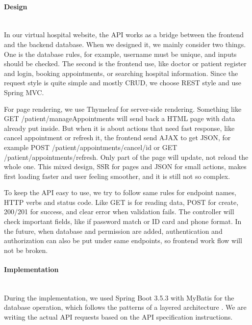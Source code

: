 %
%

\paragraph{Design}\mbox{}\\

In our virtual hospital website, the API works as a bridge between the frontend and the backend database. When we designed it, we mainly consider two things. One is the database rules, for example, username must be unique, and inputs should be checked. The second is the frontend use, like doctor or patient register and login, booking appointments, or searching hospital information. Since the request style is quite simple and mostly CRUD, we choose REST style and use Spring MVC.

For page rendering, we use Thymeleaf for server-side rendering. Something like GET /patient/manageAppointments will send back a HTML page with data already put inside. But when it is about actions that need fast response, like cancel appointment or refresh it, the frontend send AJAX to get JSON, for example POST /patient/appointments/cancel/{id} or GET /patient/appointments/refresh. Only part of the page will update, not reload the whole one. This mixed design, SSR for pages and JSON for small actions, makes first loading faster and user feeling smoother, and it is still not so complex.

To keep the API easy to use, we try to follow same rules for endpoint names, HTTP verbs and status code. Like GET is for reading data, POST for create, 200/201 for success, and clear error when validation fails. The controller will check important fields, like if password match or ID card and phone format. In the future, when database and permission are added, authentication and authorization can also be put under same endpoints, so frontend work flow will not be broken.

\paragraph{Implementation}\mbox{}\\

During the implementation, we used Spring Boot 3.5.3 with MyBatis for the database operation, which follows the patterns of a layered architecture \cite{fowler2002}. We are writing the actual API requests based on the API specification instructions.

